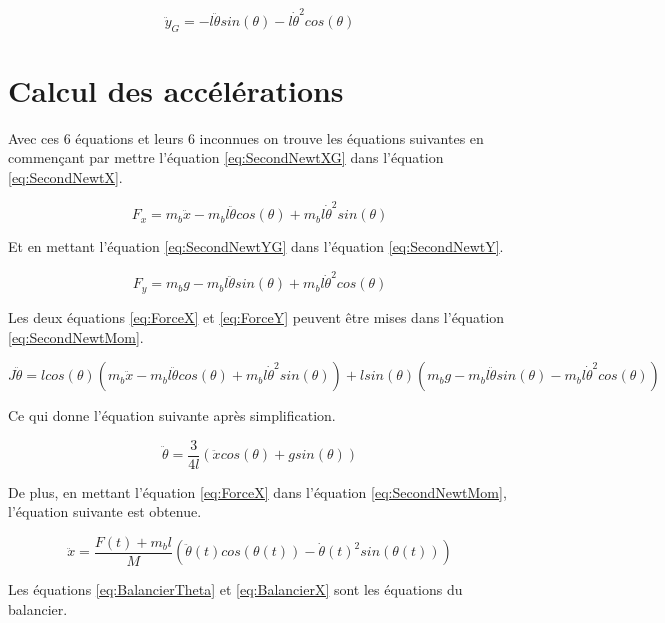 \begin{equation}\label{eq:SecondNewtYG}
    \ddot{y}_G = - l\ddot{\theta}sin(\theta) - l\dot{\theta}^2cos(\theta)
\end{equation}

\section{Calcul des accélérations}\label{sec:CalcAcc}
Avec ces 6 équations et leurs 6 inconnues on trouve les équations suivantes en commençant par mettre l'équation \ref{eq:SecondNewtXG}
dans l'équation \ref{eq:SecondNewtX}.

\begin{equation}\label{eq:ForceX}
    F_x = m_b\ddot{x} - m_bl\ddot{\theta}cos(\theta) + m_bl\dot{\theta}^2sin(\theta)
\end{equation}

Et en mettant l'équation \ref{eq:SecondNewtYG} dans l'équation \ref{eq:SecondNewtY}.

\begin{equation}\label{eq:ForceY}
    F_y = m_bg - m_bl\ddot{\theta}sin(\theta) + m_bl\dot{\theta}^2cos(\theta)
\end{equation}

Les deux équations \ref{eq:ForceX} et \ref{eq:ForceY} peuvent être mises dans l'équation \ref{eq:SecondNewtMom}.

\begin{equation*}
    J\ddot{\theta} = lcos(\theta)(m_b\ddot{x} - m_bl\ddot{\theta}cos(\theta) + m_bl\dot{\theta}^2sin(\theta)) + lsin(\theta)(m_bg - m_bl\ddot{\theta}sin(\theta) - m_bl\dot{\theta}^2cos(\theta))
\end{equation*}

Ce qui donne l'équation suivante après simplification.

\begin{equation}\label{eq:BalancierTheta}
    \ddot{\theta} = \frac{3}{4l}(\ddot{x}cos(\theta) + gsin(\theta))
\end{equation}

De plus, en mettant l'équation \ref{eq:ForceX} dans l'équation \ref{eq:SecondNewtMom}, l'équation suivante est obtenue.

\begin{equation}\label{eq:BalancierX}
    \ddot{x} = \frac{F(t) + m_bl}{M}(\ddot{\theta}(t)cos(\theta(t)) - \dot{\theta}(t)^2sin(\theta(t)))
\end{equation}

Les équations \ref{eq:BalancierTheta} et \ref{eq:BalancierX} sont les équations du balancier.
